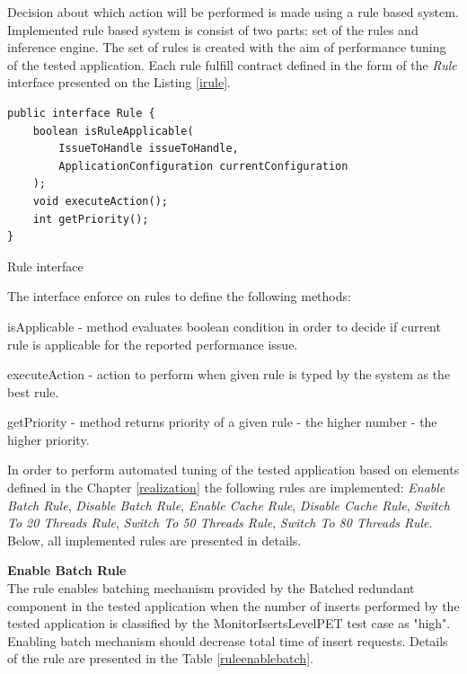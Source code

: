 \documentclass[10pt,a4paper]{article}
\let\tempone\itemize
\let\temptwo\enditemize
\renewenvironment{itemize}{\tempone\addtolength{\itemsep}{-0.4\baselineskip}}{\temptwo}
\begin{document}
Decision about which action will be performed is made using a rule based system. Implemented rule based system is consist of two parts: set of the rules and inference engine. The set of rules is created with the aim of performance tuning of the tested application. Each rule fulfill contract defined in the form of the \textit{Rule} interface presented on the Listing \ref{irule}.

\begin{listing}[ht]\begin{verbatim}
public interface Rule {
    boolean isRuleApplicable(
    	IssueToHandle issueToHandle, 
    	ApplicationConfiguration currentConfiguration
    );
    void executeAction();
    int getPriority();
}
\end{verbatim}
\caption{Rule interface} \label{irule}
\end{listing}

The interface enforce on rules to define the following methods: 
\begin{itemize}
\item isApplicable - method evaluates boolean condition in order to decide if current rule is applicable for the reported performance issue.   
\item executeAction - action to perform when given rule is typed by the system as the best rule.   
\item getPriority - method returns priority of a given rule - the higher number - the higher priority.  
\end{itemize}

In order to perform automated tuning of the tested application based on elements defined in the Chapter \ref{realization} the following rules are implemented: \textit{Enable Batch Rule}, \textit{Disable Batch Rule}, \textit{Enable Cache Rule}, \textit{Disable Cache Rule}, \textit{Switch To 20 Threads Rule}, \textit{Switch To 50 Threads Rule}, \textit{Switch To 80 Threads Rule}. Below, all implemented rules are presented in details.  

\vspace{5mm}

\noindent\textbf{Enable Batch Rule} \\
The rule enables batching mechanism provided by the Batched redundant component in the tested application when the number of  inserts performed by the tested application is classified by the MonitorIsertsLevelPET test case as "high". Enabling batch mechanism should decrease total time of insert requests. Details of the rule are presented in the Table \ref{ruleenablebatch}.
\end{document}
